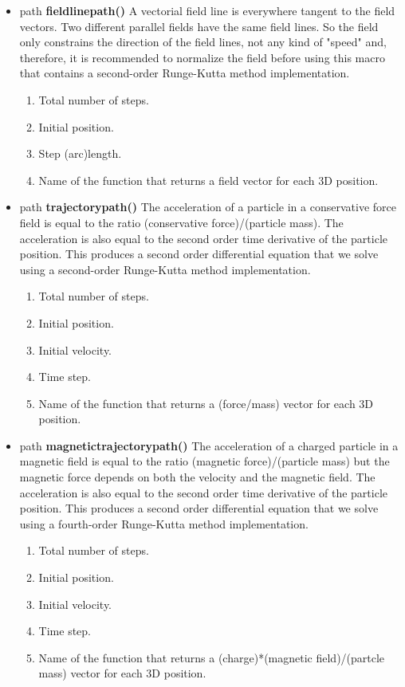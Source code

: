 \begin{itemize}
\item path {\bfseries fieldlinepath()} A vectorial field line is
everywhere tangent to the field vectors.
Two different parallel fields
have the same field lines. So the field only
constrains the direction of the field lines, not any kind
of "speed" and, therefore, it is recommended to
normalize the field before using this macro that
contains a second-order Runge-Kutta method
implementation.
\begin{enumerate}
\item {} Total number of steps.
\item {} Initial position.
\item {} Step (arc)length.
\item {} Name of the function that
returns a field vector for each 3D position.
\end{enumerate}
\item path {\bfseries trajectorypath()} The acceleration of a
particle in a conservative force field is equal to the
ratio (conservative force)/(particle mass). The
acceleration is also equal to the second order time
derivative of the particle position. This produces a
second order differential equation that we solve using a
second-order Runge-Kutta method implementation.
\begin{enumerate}
\item {} Total number of steps.
\item {} Initial position.
\item {} Initial velocity.
\item {} Time step.
\item {} Name of the function that
returns a (force/mass) vector for each 3D position.
\end{enumerate}
\item path {\bfseries magnetictrajectorypath()} The
acceleration of a
charged particle in a magnetic field is equal to the
ratio (magnetic force)/(particle mass) but the magnetic
force depends on both the velocity and the magnetic field. The
acceleration is also equal to the second order time
derivative of the particle position. This produces a
second order differential equation that we solve using a
fourth-order Runge-Kutta method implementation.
\begin{enumerate}
\item {} Total number of steps.
\item {} Initial position.
\item {} Initial velocity.
\item {} Time step.
\item {} Name of the function that
returns a (charge)*(magnetic field)/(partcle mass)
vector for each 3D position.
\end{enumerate}
\end{itemize}

